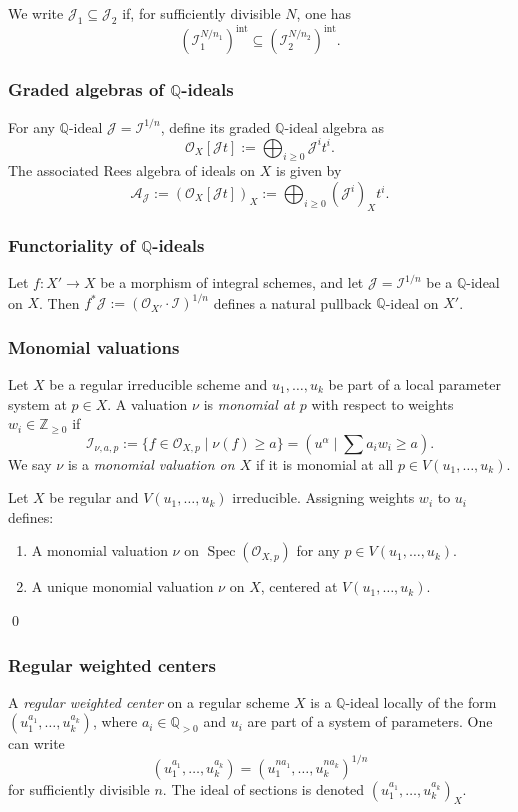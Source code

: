 \documentclass{amsart}
\newcommand{\QQ}{{\mathbb{Q}}}
\newcommand{\ZZ}{{\mathbb{Z}}}
\newcommand{\cA}{{\mathcal A}}
\newcommand{\cI}{{\mathcal I}}
\newcommand{\cJ}{{\mathcal J}}
\newcommand{\cO}{{\mathcal O}}
\newcommand{\Spec}{\operatorname{Spec}}
\newcommand{\inte}{{\operatorname{int}}}
\begin{document}
We write $\cJ_1 \subseteq \cJ_2$ if, for sufficiently divisible $N$, one has
\[
(\cI_1^{N/n_1})^\inte \subseteq (\cI_2^{N/n_2})^\inte.
\]

\subsubsection{Graded algebras of \texorpdfstring{$\QQ$}{Q}-ideals}

For any $\QQ$-ideal $\cJ = \cI^{1/n}$, define its graded $\QQ$-ideal algebra as
\[
\cO_X[\cJ t] := \bigoplus_{i \geq 0} \cJ^i t^i.
\]
The associated Rees algebra of ideals on $X$ is given by
\[
\cA_\cJ := (\cO_X[\cJ t])_X := \bigoplus_{i \geq 0} (\cJ^i)_X t^i.
\]
\subsubsection{Functoriality of $\QQ$-ideals}
Let $f\colon X'\to X$ be a morphism of integral schemes, and let $\cJ = \cI^{1/n}$ be a $\QQ$-ideal on $X$. Then $f^*\cJ := (\cO_{X'}\cdot \cI)^{1/n}$ defines a natural pullback $\QQ$-ideal on $X'$.

\subsubsection{Monomial valuations}
\begin{definition}
Let $X$ be a regular irreducible scheme and $u_1,\ldots,u_k$ be part of a local parameter system at $p\in X$. A valuation $\nu$ is \emph{monomial at $p$} with respect to weights $w_i\in \ZZ_{\geq 0}$ if
\[
\cI_{\nu,a,p} := \{f \in \cO_{X,p} \mid \nu(f) \geq a\} = (u^\alpha \mid \sum a_i w_i \geq a).
\]
We say $\nu$ is a \emph{monomial valuation on $X$} if it is monomial at all $p \in V(u_1,\ldots,u_k)$.
\end{definition}

\begin{lemma}
Let $X$ be regular and $V(u_1,\ldots,u_k)$ irreducible. Assigning weights $w_i$ to $u_i$ defines:
\begin{enumerate}
\item A monomial valuation $\nu$ on $\Spec(\cO_{X,p})$ for any $p \in V(u_1,\ldots,u_k)$.
\item A unique monomial valuation $\nu$ on $X$, centered at $V(u_1,\ldots,u_k)$.
\end{enumerate}\qed
\end{lemma}

\subsubsection{Regular weighted centers}
A \emph{regular weighted center} on a regular scheme $X$ is a $\QQ$-ideal locally of the form $(u_1^{a_1},\ldots,u_k^{a_k})$, where $a_i \in \QQ_{>0}$ and $u_i$ are part of a system of parameters. One can write
\[
(u_1^{a_1},\ldots,u_k^{a_k}) = \left(u_1^{na_1},\ldots,u_k^{na_k}\right)^{1/n}
\]
for sufficiently divisible $n$. The ideal of sections is denoted $(u_1^{a_1},\ldots,u_k^{a_k})_X$.
\end{document}
